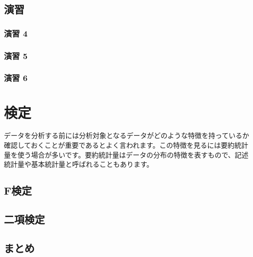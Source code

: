 \documentclass[
  12pt,
]{book}
\begin{document}
\hypertarget{ux6f14ux7fd2-4}{%
\subsection{演習}\label{ux6f14ux7fd2-4}}

\hypertarget{ux6f14ux7fd2-4-1}{%
\subsubsection*{演習 4}\label{ux6f14ux7fd2-4-1}}

\hypertarget{ux6f14ux7fd2-5}{%
\subsubsection*{演習 5}\label{ux6f14ux7fd2-5}}

\hypertarget{ux6f14ux7fd2-6}{%
\subsubsection*{演習 6}\label{ux6f14ux7fd2-6}}

\hypertarget{ux691cux5b9a}{%
\section{検定}\label{ux691cux5b9a}}

データを分析する前には分析対象となるデータがどのような特徴を持っているか確認しておくことが重要であるとよく言われます。この特徴を見るには要約統計量を使う場合が多いです。要約統計量はデータの分布の特徴を表すもので、記述統計量や基本統計量と呼ばれることもあります。

\hypertarget{fux691cux5b9a}{%
\subsection{F検定}\label{fux691cux5b9a}}

\hypertarget{ux4e8cux9805ux691cux5b9a}{%
\subsection{二項検定}\label{ux4e8cux9805ux691cux5b9a}}

\hypertarget{ux307eux3068ux3081-3}{%
\subsection{まとめ}\label{ux307eux3068ux3081-3}}
\end{document}
